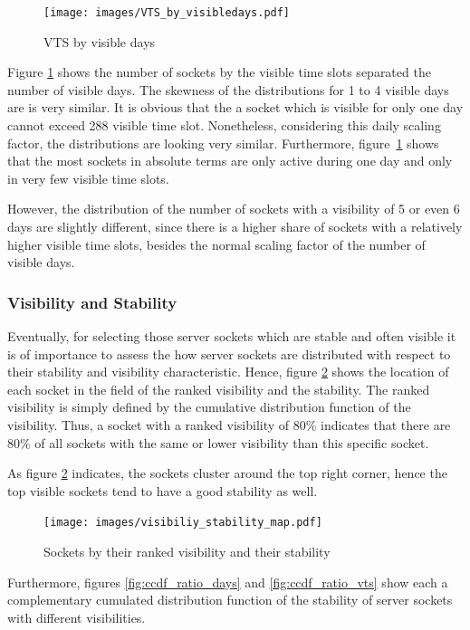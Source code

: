 \begin{figure}
	[hb] \centering 
	\texttt{[image: images/VTS\_by\_visibledays.pdf]}
	\caption{VTS by visible days} 
	\label{fig:vts_by_visibledays} 
\end{figure}

Figure \ref{fig:vts_by_visibledays} shows the number of sockets by the visible time slots separated the number of visible days. The skewness of the 
distributions for 1 to 4 visible days are is very similar. It is obvious that 
the a socket which is visible for only one day cannot exceed 288 visible time 
slot. Nonetheless, considering this daily scaling factor, the distributions are 
looking very similar. Furthermore, figure \ref{fig:vts_by_visibledays} shows 
that the most sockets in absolute terms are only active during one day and only 
in very few visible time slots. 

However, the distribution of the number of sockets with a visibility of 5 or 
even 6 days are slightly different, since there is a higher share of sockets 
with a relatively higher visible time slots, besides the normal scaling factor 
of the number of visible days.

\subsubsection{Visibility and Stability}
Eventually, for selecting those server sockets which are stable and often visible it is of importance to assess the how server sockets are distributed with respect to their stability and visibility characteristic. Hence, figure \ref{fig:rankedVisibility} shows the location of each socket in the field of the ranked visibility and the stability. The ranked visibility is simply defined by the cumulative distribution function of the visibility. Thus, a socket with a ranked visibility of 80\% indicates that there are 80\% of all sockets with the same or lower visibility than this specific socket. 

As figure \ref{fig:rankedVisibility} indicates, the sockets cluster around the top right corner, hence the top visible sockets tend to have a good stability as well.

\begin{figure}
	[hb] \centering 
	\texttt{[image: images/visibiliy\_stability\_map.pdf]}
	\caption{Sockets by their ranked visibility and their stability} 
	\label{fig:rankedVisibility} 
\end{figure}


Furthermore, figures \ref{fig:ccdf_ratio_days} and \ref{fig:ccdf_ratio_vts} show 
each a complementary cumulated distribution function of the stability of server 
sockets with different visibilities. 


